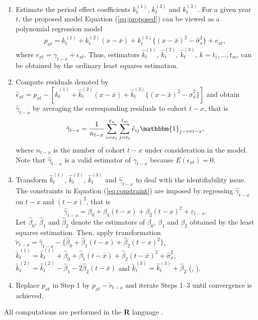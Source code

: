 \documentclass[11pt,letterpaper]{article}
\numberwithin{equation}{section}
\begin{document}
\begin{enumerate}
\item  Estimate the period effect coefficients $k_t^{(1)}$, $k_t^{(2)}$ and $k_t^{(3)}$.
For a given year $t$, the proposed model Equation (\ref{eq:proposed}) can be viewed as a polynomial regression model
\begin{eqnarray*}
p_{xt}=k_t^{(1)}+ k_t^{(2)}(x - \bar{x}) + k_t^{(3)}\{(x - \bar{x})^{2} - \hat\sigma_x^{2}\} +e_{xt},
\end{eqnarray*}
where $e_{xt}=\gamma_{t-x}+\epsilon_{xt}$. Thus, estimators $\hat{k}_t^{(1)}$, $\hat{k}_t^{(2)}$, $\hat{k}_t^{(3)}$, $k=t_1,\dots,t_m$, can be obtained by the ordinary least squares estimation.

\item Compute residuals denoted by $\hat{e}_{xt}=p_{xt}-[\hat{k}_t^{(1)}+ \hat{k}_t^{(2)}(x - \bar{x}) + \hat{k}_t^{(3)}\{(x - \bar{x})^{2} - \hat\sigma_x^{2}\}]$ and obtain $\hat\gamma_{t-x}$ by averaging the corresponding residuals to cohort $t-x$, that is
$$
\hat\gamma_{t-x}=\frac{1}{n_{t-x}}\sum_{i=x_1}^{x_n}\sum_{j=t_1}^{t_m}\hat{e}_{ij}\mathbbm{1}_{j-i=t-x},
$$
where $n_{t-x}$ is the number of cohort $t-x$  under consideration in the model.  Note that $\hat\gamma_{t-x}$ is a valid estimator of   $\gamma_{t-x}$ because $E(\epsilon_{xt})=0$.

\item Transform $\hat{k}_t^{(1)}$, $\hat{k}_t^{(2)}$, $\hat{k}_t^{(3)}$ and $\hat\gamma_{t-x}$  to deal with the identifiability issue.  The constraints in Equation (\ref{eq:constraint}) are imposed by regressing  $\hat{\gamma}_{t-x}$ on $t-x$ and $(t-x)^2$, that is
$$
\hat{\gamma}_{t-x}=\beta_0+\beta_1(t-x)+\beta_2(t-x)^2+\varepsilon_{t-s}.
$$
Let  $\hat\beta_0$, $\hat\beta_1$ and  $\hat\beta_2$ denote  the estimators of $\beta_0$, $\beta_1$ and  $\beta_2$ obtained by the least squares estimation. Then, apply transformation $\tilde{r}_{t-x}=\hat{\gamma}_{t-x}-\{\hat\beta_0+\hat\beta_1(t-x)+\hat{\beta}_2(t-x)^2\}$, $\tilde{k}_t^{(1)}=\hat{k}_t^{(1)}+\hat\beta_0+\hat\beta_1(t-\bar{x})+\hat{\beta}_2(t-\bar{x})^2+\hat{\sigma}_x^2$,  $\tilde{k}_t^{(2)}=\hat{k}_t^{(2)}-\hat\beta_1-2\hat\beta_2(t-\bar{x})$  and  $\tilde{k}_t^{(3)}=\hat{k}_t^{(3)}+\hat\beta_2$ (\citep{Cairns+Blake+Dowd+Coughlan+Epstein+Ong+Balevich:2009}, \citep{villegas2015stmomo}).
\item Replace $p_{xt}$ in Step 1 by $p_{xt}-\tilde{r}_{t-x}$ and  iterate Steps 1--3 until convergence is achieved.
\end{enumerate}
All computations are performed in the \textbf{R} language \citep{R-Core:2016}.
\end{document}
